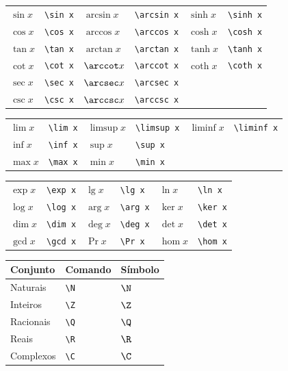 \documentclass[fleqn]{icat-ufal}
\begin{document}
\begin{spacing}{1}
\begin{longtable}{p{16mm}p{25mm}p{16mm}p{25mm}p{16mm}p{20mm}} \hline
  $\sin x$ & \lstinline!\sin x! &     $\arcsin x$ & \lstinline!\arcsin x! &     $\sinh x$ & \lstinline!\sinh x! \\
  $\cos x$ & \lstinline!\cos x! &     $\arccos x$ & \lstinline!\arccos x! &     $\cosh x$ & \lstinline!\cosh x! \\
  $\tan x$ & \lstinline!\tan x! &     $\arctan x$ & \lstinline!\arctan x! &     $\tanh x$ & \lstinline!\tanh x! \\
  $\cot x$ & \lstinline!\cot x! &     $\arccot x$ & \lstinline!\arccot x! &     $\coth x$ & \lstinline!\coth x! \\
  $\sec x$ & \lstinline!\sec x! &     $\arcsec x$ & \lstinline!\arcsec x! \\
  $\csc x$ & \lstinline!\csc x! &     $\arccsc x$ & \lstinline!\arccsc x! \\ \hline
\end{longtable}        

\begin{longtable}{p{16mm}p{25mm}p{16mm}p{25mm}p{16mm}p{20mm}} \hline
  $\lim x$ & \lstinline!\lim x! &     $\limsup x$ & \lstinline!\limsup x! &     $\liminf x$ & \lstinline!\liminf x! \\
  $\inf x$ & \lstinline!\inf x! &     $\sup x$ & \lstinline!\sup x! \\
  $\max x$ & \lstinline!\max x! &     $\min x$ & \lstinline!\min x! \\ \hline
\end{longtable}        

\begin{longtable}{p{16mm}p{25mm}p{16mm}p{25mm}p{16mm}p{20mm}} \hline
  $\exp x$ & \lstinline!\exp x! &
  $\lg  x$ & \lstinline!\lg x!  &
  $\ln  x$ & \lstinline!\ln x!  \\
  $\log x$ & \lstinline!\log x! &
  $\arg x$ & \lstinline!\arg x! &
  $\ker x$ & \lstinline!\ker x! \\
  $\dim x$ & \lstinline!\dim x! &
  $\deg x$ & \lstinline!\deg x! &
  $\det x$ & \lstinline!\det x! \\
  $\gcd x$ & \lstinline!\gcd x! &
  $\Pr  x$ & \lstinline!\Pr x!  &
  $\hom x$ & \lstinline!\hom x! \\ \hline
\end{longtable}        

\begin{longtable}{p{30mm}p{30mm}p{30mm}}  \hline
  Conjunto  &    Comando     & Símbolo \\ \hline
  \endhead
  Naturais  & \lstinline!\N! &  $\N$   \\
  Inteiros  & \lstinline!\Z! &  $\Z$   \\
  Racionais & \lstinline!\Q! &  $\Q$   \\
  Reais     & \lstinline!\R! &  $\R$   \\
  Complexos & \lstinline!\C! &  $\C$   \\ \hline
\end{longtable}


\end{spacing}
\end{document}
